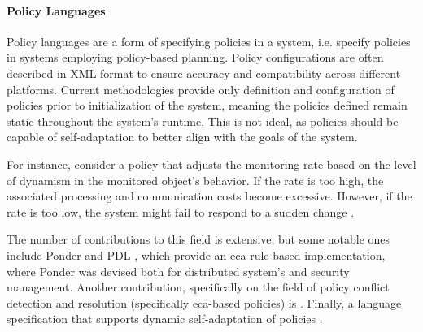 \paragraph{Policy Languages}
\label{par:policylanguages}
\par Policy languages are a form of specifying policies in a system, i.e. specify policies in systems employing policy-based planning. Policy configurations are often described in XML format to ensure accuracy and compatibility across different platforms. Current methodologies provide only definition and configuration of policies prior to initialization of the system, meaning the policies defined remain static throughout the system's runtime. This is not ideal, as policies should be capable of self-adaptation to better align with the goals of the system.%
\par For instance, consider a policy that adjusts the monitoring rate based on the level of dynamism in the monitored object's behavior. If the rate is too high, the associated processing and communication costs become excessive. However, if the rate is too low, the system might fail to respond to a sudden change \cite{Anthony2006}.
\par The number of contributions to this field is extensive, but some notable ones include Ponder \cite{Damianou2001} and PDL \cite{Lobo1999}, which provide an \gls{eca} rule-based implementation, where Ponder was devised both for distributed system's and security management. Another contribution, specifically on the field of policy conflict detection and resolution (specifically \gls{eca}-based policies) is \cite{Chomicki2001}. Finally, a language specification that supports dynamic self-adaptation of policies \cite{Anthony2006}.
%
%
%
